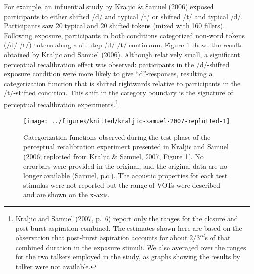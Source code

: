 \documentclass[
  11pt,
  english,
  man,floatsintext]{apa6}
\begin{document}
For example, an influential study by \protect\hyperlink{ref-kraljic-samuel2006}{Kraljic \& Samuel} (\protect\hyperlink{ref-kraljic-samuel2006}{2006}) exposed participants to either shifted /d/ and typical /t/ or shifted /t/ and typical /d/. Participants saw 20 typical and 20 shifted tokens (mixed with 160 fillers). Following exposure, participants in both conditions categorized non-word tokens (/d/-/t/) tokens along a six-step /d/-/t/ continuum. Figure \ref{fig:kraljic-samuel-2007-replotted} shows the results obtained by Kraljic and Samuel (2006). Although relatively small, a significant perceptual recalibration effect was observed: participants in the /d/-shifted exposure condition were more likely to give ``d''-responses, resulting a categorization function that is shifted rightwards relative to participants in the /t/-shifted condition. This shift in the category boundary is the signature of perceptual recalibration experiments.\footnote{Kraljic and Samuel (2007, p.~6) report only the ranges for the closure and post-burst aspiration combined. The estimates shown here are based on the observation that post-burst aspiration accounts for about \(2/3^{rd}\)s of that combined duration in the exposure stimuli. We also averaged over the ranges for the two talkers employed in the study, as graphs showing the results by talker were not available.}



\begin{figure}

{\centering \texttt{[image: ../figures/knitted/kraljic-samuel-2007-replotted-1]} 

}

\caption{Categorization functions observed during the test phase of the perceptual recalibration experiment presented in Kraljic and Samuel (2006; replotted from Kraljic \& Samuel, 2007, Figure 1). No errorbars were provided in the original, and the original data are no longer available (Samuel, p.c.). The acoustic properties for each test stimulus were not reported but the range of VOTs were described and are shown on the x-axis.}\label{fig:kraljic-samuel-2007-replotted}
\end{figure}
\end{document}
